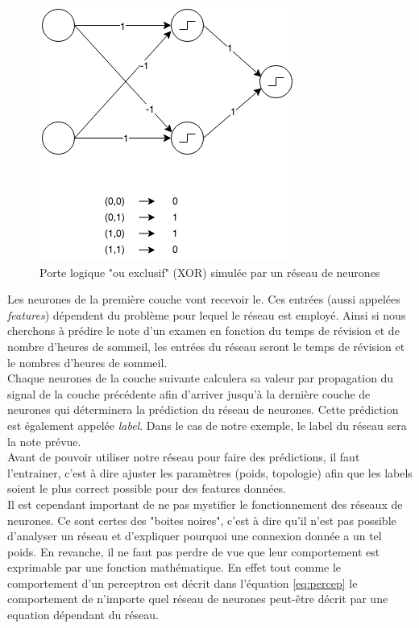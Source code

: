 \documentclass{article}
\begin{document}
\begin{figure}[h]
\begin{center}
	\includegraphics[scale=0.7]{xor.png} 
	\caption{Porte logique "ou exclusif" (XOR) simulée par un réseau de neurones}
\end{center}
\end{figure}

Les neurones de la première couche vont recevoir le. Ces entrées (aussi appelées \textit{features}) dépendent du problème pour lequel le réseau est employé. Ainsi si nous cherchons à prédire le note d'un examen en fonction du temps de révision et de nombre d'heures de sommeil, les entrées du réseau seront le temps de révision et le nombres d'heures de sommeil.\\
 Chaque neurones de la couche suivante calculera sa valeur par propagation du signal de la couche précédente afin d'arriver jusqu'à la dernière couche de neurones qui déterminera la prédiction du réseau de neurones. Cette prédiction est également appelée \textit{label}. Dans le cas de notre exemple, le label du réseau sera la note prévue.\\
 Avant de pouvoir utiliser notre réseau pour faire des prédictions, il faut l'entrainer, c'est à dire ajuster les paramètres (poids, topologie) afin que les labels soient le plus correct possible pour des features données.\\
 
 Il est cependant important de ne pas mystifier le fonctionnement des réseaux de neurones. Ce sont certes des "boites noires", c'est à dire qu'il n'est pas possible d'analyser un réseau et d'expliquer pourquoi une connexion donnée a un tel poids. En revanche, il ne faut pas perdre de vue que leur comportement est exprimable par une fonction mathématique. En effet tout comme le comportement d'un perceptron est décrit dans l'équation \ref{eq:percep} le comportement de n'importe quel réseau de neurones peut-être décrit par une equation dépendant du réseau.
\end{document}
